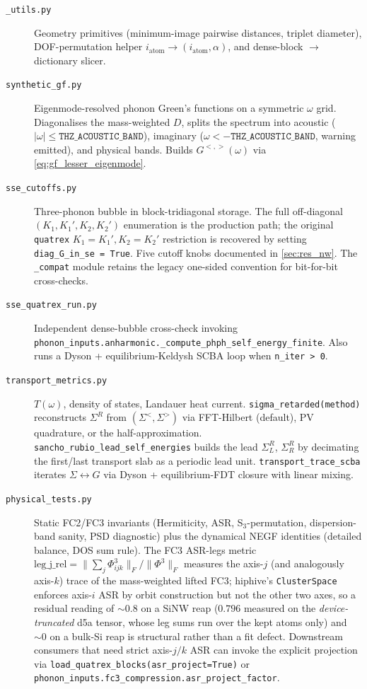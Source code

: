 \begin{description}
\item[\texttt{\_utils.py}] Geometry primitives (minimum-image
  pairwise distances, triplet diameter), DOF-permutation helper
  $i_{\mathrm{atom}} \to (i_{\mathrm{atom}}, \alpha)$, and dense-block
  $\to$ dictionary slicer.

\item[\texttt{synthetic\_gf.py}] Eigenmode-resolved phonon Green's
  functions on a symmetric $\omega$ grid.  Diagonalises the
  mass-weighted $D$, splits the spectrum into acoustic ($|\omega| \le
  \texttt{THZ\_ACOUSTIC\_BAND}$), imaginary ($\omega < -\texttt{THZ\_ACOUSTIC\_BAND}$,
  warning emitted), and physical bands.  Builds $G^{<,>}(\omega)$ via
  \cref{eq:gf_lesser_eigenmode}.

\item[\texttt{sse\_cutoffs.py}] Three-phonon bubble in block-tridiagonal
  storage.  The full off-diagonal $(K_1, K_1', K_2, K_2')$ enumeration
  is the production path; the original \texttt{quatrex} $K_1 = K_1', K_2
  = K_2'$ restriction is recovered by setting \texttt{diag\_G\_in\_se =
  True}.  Five cutoff knobs documented in \cref{sec:res_nw}.  The
  \texttt{\_compat} module retains the legacy one-sided convention for
  bit-for-bit cross-checks.

\item[\texttt{sse\_quatrex\_run.py}] Independent dense-bubble cross-check
  invoking \texttt{phonon\_inputs.anharmonic.\_compute\_phph\_self\_energy\_finite}.
  Also runs a Dyson + equilibrium-Keldysh SCBA loop when
  \texttt{n\_iter > 0}.

\item[\texttt{transport\_metrics.py}] $T(\omega)$, density of states,
  Landauer heat current.  \texttt{sigma\_retarded(method)} reconstructs
  $\Sigma^R$ from $(\Sigma^<, \Sigma^>)$ via FFT-Hilbert (default), PV
  quadrature, or the half-approximation.  \texttt{sancho\_rubio\_lead\_self\_energies}
  builds the lead $\Sigma_L^R$, $\Sigma_R^R$ by decimating the
  first/last transport slab as a periodic lead unit.
  \texttt{transport\_trace\_scba} iterates $\Sigma \leftrightarrow G$
  via Dyson + equilibrium-FDT closure with linear mixing.

\item[\texttt{physical\_tests.py}] Static FC2/FC3 invariants
  (Hermiticity, ASR, S$_3$-permutation, dispersion-band sanity,
  PSD diagnostic) plus the dynamical NEGF identities (detailed
  balance, DOS sum rule).  The FC3 ASR-legs metric
  $\mathrm{leg\_j\_rel} = \|\sum_j \Phi^3_{ijk}\|_F / \|\Phi^3\|_F$
  measures the axis-$j$ (and analogously axis-$k$) trace of the
  mass-weighted lifted FC3; hiphive's \texttt{ClusterSpace} enforces
  axis-$i$ ASR by orbit construction but not the other two axes, so
  a residual reading of $\sim 0.8$ on a SiNW reap ($0.796$ measured on
  the \emph{device-truncated} d5a tensor, whose leg sums run over the
  kept atoms only) and $\sim 0$ on a bulk-Si reap is structural rather
  than a fit defect.  Downstream
  consumers that need strict
  axis-$j/k$ ASR can invoke the explicit projection via
  \texttt{load\_quatrex\_blocks(asr\_project=True)} or
  \texttt{phonon\_inputs.fc3\_compression.asr\_project\_factor}.


\end{description}
